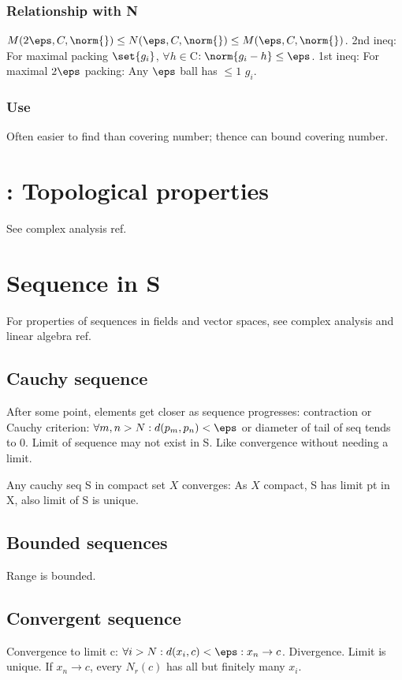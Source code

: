 \documentclass[oneside, article]{memoir}
\begin{document}
\subsubsection{Relationship with N}
$M(2\eps, C, \norm{}) \leq N(\eps, C, \norm{}) \leq M(\eps, C, \norm{})$. 2nd ineq: For maximal packing $\set{g_i}$, $\forall h \in $C$: \norm{g_i-h} \leq \eps$. 1st ineq: For maximal $2 \eps$ packing: Any $\eps$ ball has $\leq 1$ $g_i$.

\subsubsection{Use}
Often easier to find than covering number; thence can bound covering number.

\section{: Topological properties }
See complex analysis ref.

\section{Sequence  in S}
For properties of sequences in fields and vector spaces, see complex analysis and linear algebra ref.

\subsection{Cauchy sequence}
After some point, elements get closer as sequence progresses: contraction or Cauchy criterion: $\forall m, n> N: d(p_{m}, p_{n}) < \eps$ or diameter of tail of seq tends to 0. Limit of sequence may not exist in S. Like convergence without needing a limit.

Any cauchy seq S in compact set $X$ converges: As $X$ compact, S has limit pt in X, also limit of S is unique.

\subsection{Bounded sequences}
Range is bounded.

\subsection{Convergent sequence}
Convergence to limit c: $\forall i>N: d(x_{i}, c) < \eps: x_{n} \to c$. Divergence. Limit is unique. If $x_{n} \to c$, every $N_{r}(c)$ has all but finitely many $x_{i}$.
\end{document}
